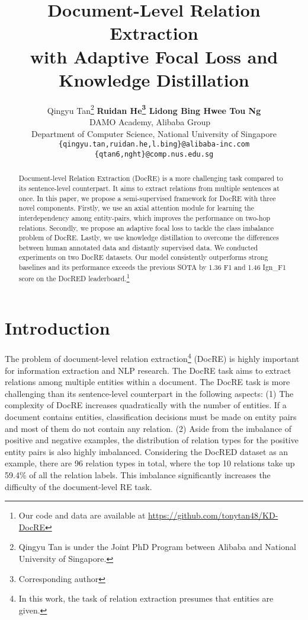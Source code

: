 \documentclass[11pt]{article}
\title{Document-Level Relation Extraction \\ with Adaptive Focal Loss and Knowledge Distillation}
\author{Qingyu Tan\thanks{  Qingyu Tan is under the Joint PhD Program between Alibaba and National University of Singapore.} \quad \textbf{Ruidan He\thanks{  Corresponding author} \quad Lidong Bing \quad Hwee Tou Ng} 
\\DAMO Academy, Alibaba Group~~\\
Department of Computer Science, National University of Singapore\\
\texttt{\{qingyu.tan,ruidan.he,l.bing\}@alibaba-inc.com}\\
\texttt{\{qtan6,nght\}@comp.nus.edu.sg}\\
}
\begin{document}
\maketitle
\begin{abstract}
Document-level Relation Extraction (DocRE) is a more challenging task compared to its sentence-level counterpart. It aims to extract relations from multiple sentences at once. In this paper, we propose a semi-supervised framework for DocRE with three novel components. Firstly, we use an axial attention module for learning the interdependency among entity-pairs, which improves the performance on two-hop relations. Secondly, we propose an adaptive focal loss to tackle the class imbalance problem of DocRE. Lastly, we use knowledge distillation to overcome the differences between human annotated data and distantly supervised data. We conducted experiments on two DocRE datasets. Our model consistently outperforms strong baselines and its performance exceeds the previous SOTA by 1.36 F1 and 1.46 Ign\_F1 score on the DocRED leaderboard.\footnote{Our code and data are available at {\url{https://github.com/tonytan48/KD-DocRE}}} 
\end{abstract}



\section{Introduction}






The problem of document-level relation extraction\footnote{In this work, the task of relation extraction presumes that entities are given.} (DocRE) is highly important for information extraction and NLP research. The DocRE task aims to extract relations among multiple entities within a document. The DocRE task is more challenging than its sentence-level counterpart in the following aspects: (1) The complexity of DocRE increases quadratically with the number of entities. If a document contains  entities, classification decisions must be made on  entity pairs and most of them do not contain any relation. (2) Aside from the imbalance of positive and negative examples, the distribution of relation types for the positive entity pairs is also highly imbalanced. Considering the DocRED \citep{yao2019docred} dataset as an example, there are 96 relation types in total, where the top 10 relations take up 59.4\% of all the relation labels. This imbalance significantly increases the difficulty of the document-level RE task.
\end{document}
